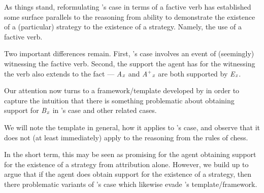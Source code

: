 \documentclass[10pt]{article}
\newcommand{\tri}[2]{\emph{#2}\(_{\text{\tiny\emph #1}}\)}
\begin{document}
\begin{note}
  As things stand, reformulating \citeauthor{Dretske:2005vy}'s case in terms of a factive verb has established some surface parallels to the reasoning from ability to demonstrate the existence of a (particular) strategy to the existence of a strategy.
  Namely, the use of a factive verb.

  Two important differences remain.
  First, \citeauthor{Dretske:2005vy}'s case involves an event of (seemingly) witnessing the factive verb.
  Second, the support the agent has for the witnessing the verb also extends to the fact --- \tri{Z}{A} and \tri{Z}{A\(^{+}\)} are both supported by \tri{Z}{E}.
\end{note}

\begin{note}[Moving on]
  Our attention now turns to a framework/template developed by \citeauthor{Wright:2011wn} in order to capture the intuition that there is something problematic about obtaining support for \tri{Z}{B} in \citeauthor{Dretske:2005vy}'s case and other related cases.

  We will note the template in general, how it applies to \citeauthor{Dretske:2005vy}'s case, and observe that it does not (at least immediately) apply to the reasoning from the rules of chess.

  In the short term, this may be seen as promising for the agent obtaining support for the existence of a strategy from attribution alone.
  However, we build up to argue that if the agent does obtain support for the existence of a strategy, then there problematic variants of \citeauthor{Dretske:2005vy}'s case which likewise evade \citeauthor{Wright:2011wn}'s template/framework.
\end{note}
\end{document}

